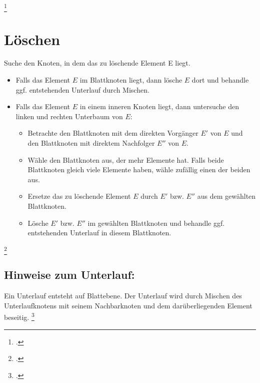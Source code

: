 \documentclass{lehramt-informatik-haupt}
\begin{document}
\footcite[Seite 37 (PDF 31)]{aud:fs:5}

%

\section{Löschen}

Suche den Knoten, in dem das zu löschende Element E liegt.

\begin{itemize}
\item Falls das Element $E$ im Blattknoten liegt, dann lösche $E$ dort
und behandle ggf. entstehenden Unterlauf durch Mischen.

\item Falls das Element $E$ in einem inneren Knoten liegt, dann
untersuche den linken und rechten Unterbaum von $E$:

\begin{itemize}
\item Betrachte den Blattknoten mit dem direkten Vorgänger $E'$ von $E$
und den Blattknoten mit direktem Nachfolger $E''$ von $E$.

\item Wähle den Blattknoten aus, der mehr Elemente hat. Falls beide
Blattknoten gleich viele Elemente haben, wähle zufällig einen der beiden
aus.

\item Ersetze das zu löschende Element $E$ durch $E'$ bzw. $E''$ aus dem
gewählten Blattknoten.

\item Lösche $E'$ bzw. $E''$ im gewählten Blattknoten und behandle ggf.
entstehenden Unterlauf in diesem Blattknoten.
\end{itemize}
\end{itemize}

\footcite[Seite 39 (PDF 32)]{aud:fs:5}

\subsection{Hinweise zum Unterlauf:}

Ein Unterlauf entsteht auf Blattebene. Der Unterlauf wird durch Mischen
des Unterlaufknotens mit seinem Nachbarknoten und dem darüberliegenden
Element beseitig.
\footcite[Seite 40 (PDF 33)]{aud:fs:5}

\literatur
\end{document}
